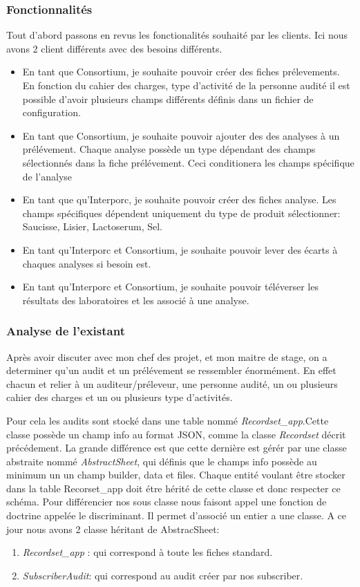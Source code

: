 \subsubsection{Fonctionnalités}
Tout d'abord passons en revus les fonctionalités souhaité par les clients. Ici nous avons 2 client différents avec des besoins différents.
\begin{itemize}
    \item En tant que Consortium, je souhaite pouvoir créer des fiches prélevements. En fonction du cahier des charges, type d'activité de la personne audité il est possible d'avoir plusieurs champs différents définis dans un fichier de configuration.
    \item En tant que Consortium, je souhaite pouvoir ajouter des des analyses à un prélévement. Chaque analyse possède un type dépendant des champs sélectionnés dans la fiche prélévement. Ceci conditionera les champs spécifique de l'analyse
    \item En tant que qu'Interporc, je souhaite pouvoir créer des fiches analyse. Les champs spécifiques dépendent uniquement du type de produit sélectionner: Saucisse, Lisier, Lactoserum, Sel. 
    \item En tant qu'Interporc et Consortium, je souhaite pouvoir lever des écarts à chaques analyses si besoin est.  
    \item En tant qu'Interporc et Consortium, je souhaite pouvoir téléverser les résultats des laboratoires et les associé à une analyse. 
\end{itemize}



\subsubsection{Analyse de l'existant}


Après avoir discuter avec mon chef des projet, et mon maitre de stage, on a determiner qu'un audit et un prélévement se ressembler énormément. En effet chacun et relier à un auditeur/préleveur, une personne audité, un ou plusieurs cahier des charges et un ou plusieurs type d'activités. 

Pour cela les audits sont stocké dans une table nommé \textit{Recordset\_app}.Cette classe possède un champ info au format JSON, comme la classe \textit{Recordset}  décrit précédement. La grande différence est que cette dernière est gérér par une classe abstraite nommé \textit{AbstractSheet}, qui définis que le champs info possède au minimum un un champ builder, data et files. Chaque entité voulant être stocker dans la table Recorset\_app doit étre hérité de cette classe et donc respecter ce schéma. Pour différencier nos sous classe nous faisont appel une fonction de doctrine appelée le discriminant. Il permet d'associé un entier a une classe. A ce jour nous avons 2 classe héritant de AbstracSheet: 
\begin{enumerate}
    \item \textit{Recordset\_app} : qui correspond à toute les fiches standard. 
    \item \textit{SubscriberAudit}: qui correspond au audit créer par nos subscriber. 
\end{enumerate}

